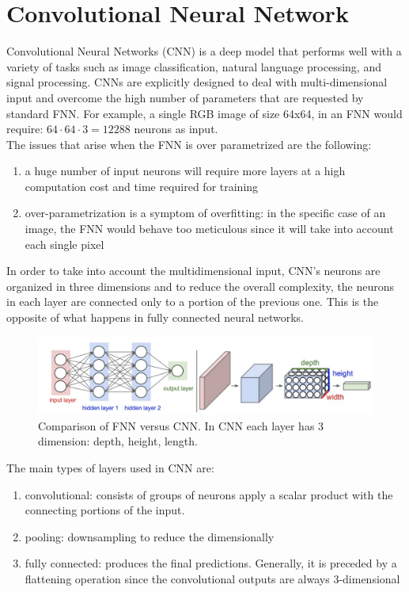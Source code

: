 \documentclass[LaM,binding=0.6cm]{sapthesis}
\begin{document}
\section{Convolutional Neural Network}
Convolutional Neural Networks (CNN) is a deep model that performs well with a variety of tasks such as image classification, natural language processing, and signal processing. CNNs are explicitly designed to deal with multi-dimensional input and overcome the high number of parameters that are requested by standard FNN. For example, a single RGB image of size 64x64, in an FNN would require: $64\cdot64\cdot3=12288$ neurons as input.\\The issues that arise when the FNN is over parametrized are the following:
\begin{enumerate}
\item a huge number of input neurons will require more layers at a high computation cost and time required for training 
\item over-parametrization is a symptom of overfitting: in the specific case of an image, the FNN would behave too meticulous since it will take into account each single pixel
\end{enumerate}
In order to take into account the multidimensional input, CNN's neurons are organized in three dimensions and to reduce the overall complexity, the neurons in each layer are connected only to a portion of the previous one. This is the opposite of what happens in fully connected neural networks. 
\begin{figure}[H]  \centering
    \includegraphics[width=150mm,scale=0.7]{convgen}
    \caption{Comparison of FNN versus CNN. In CNN each layer has 3 dimension: depth, height, length.\cite{cnnsite}}
    \label{fig:convgen}
\end{figure}
The main types of layers used in CNN are:
\begin{enumerate}
\item convolutional: consists of groups of neurons apply a scalar product with the connecting portions of the input.
\item pooling: downsampling to reduce the dimensionally 
\item fully connected: produces the final predictions. Generally, it is preceded by a flattening operation since the convolutional outputs are always 3-dimensional
\end{enumerate}
\end{document}
